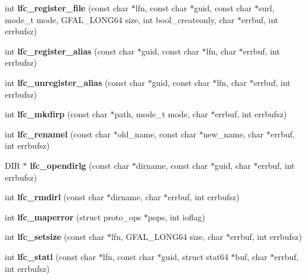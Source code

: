 \begin{CompactItemize}
\item 
int \textbf{lfc\_\-register\_\-file} (const char $\ast$lfn, const char $\ast$guid, const char $\ast$surl, mode\_\-t mode, GFAL\_\-LONG64 size, int bool\_\-createonly, char $\ast$errbuf, int errbufsz)\label{group__lfc__low__group_gdc3db49fb133cc79ae3250731167b478}

\item 
int \textbf{lfc\_\-register\_\-alias} (const char $\ast$guid, const char $\ast$lfn, char $\ast$errbuf, int errbufsz)\label{group__lfc__low__group_gbcf2a1618d925816f8b570cdeac04afd}

\item 
int \textbf{lfc\_\-unregister\_\-alias} (const char $\ast$guid, const char $\ast$lfn, char $\ast$errbuf, int errbufsz)\label{group__lfc__low__group_g776fc6004cd4c565c42be3365a719376}

\item 
int \textbf{lfc\_\-mkdirp} (const char $\ast$path, mode\_\-t mode, char $\ast$errbuf, int errbufsz)\label{group__lfc__low__group_gb13d4fafbe48d4748371fb2780381908}

\item 
int \textbf{lfc\_\-renamel} (const char $\ast$old\_\-name, const char $\ast$new\_\-name, char $\ast$errbuf, int errbufsz)\label{group__lfc__low__group_gf0a92088b3b2bd149ad3968573d3dbce}

\item 
DIR $\ast$ \textbf{lfc\_\-opendirlg} (const char $\ast$dirname, const char $\ast$guid, char $\ast$errbuf, int errbufsz)\label{group__lfc__low__group_ge22436958fd4ad2bb2bcc1b608aa7f34}

\item 
int \textbf{lfc\_\-rmdirl} (const char $\ast$dirname, char $\ast$errbuf, int errbufsz)\label{group__lfc__low__group_ga46361de52e13b63a74c50589a75fa33}

\item 
int \textbf{lfc\_\-maperror} (struct proto\_\-ops $\ast$pops, int ioflag)\label{group__lfc__low__group_g6be41de8da5424cc099b88ec27f772c0}

\item 
int \textbf{lfc\_\-setsize} (const char $\ast$lfn, GFAL\_\-LONG64 size, char $\ast$errbuf, int errbufsz)\label{group__lfc__low__group_g30eee0fb314a09f9b28cddd249ccf692}

\item 
int \textbf{lfc\_\-statl} (const char $\ast$lfn, const char $\ast$guid, struct stat64 $\ast$buf, char $\ast$errbuf, int errbufsz)\label{group__lfc__low__group_g3115c08a5c7ffb01087a192358a40ca1}


\end{CompactItemize}
